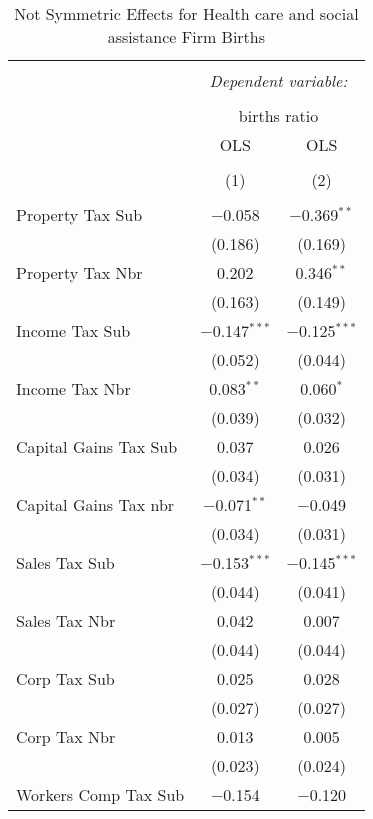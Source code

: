 
\begin{table}[!htbp] \centering 
  \caption{Not Symmetric Effects for  Health care and social assistance Firm Births} 
  \label{} 
\begin{tabular}{@{\extracolsep{5pt}}lcc} 
\\[-1.8ex]\hline 
\hline \\[-1.8ex] 
 & \multicolumn{2}{c}{\textit{Dependent variable:}} \\ 
\cline{2-3} 
\\[-1.8ex] & \multicolumn{2}{c}{births ratio} \\ 
 & OLS & OLS \\ 
\\[-1.8ex] & (1) & (2)\\ 
\hline \\[-1.8ex] 
 Property Tax Sub & $-$0.058 & $-$0.369$^{**}$ \\ 
  & (0.186) & (0.169) \\ 
  Property Tax Nbr & 0.202 & 0.346$^{**}$ \\ 
  & (0.163) & (0.149) \\ 
  Income Tax Sub & $-$0.147$^{***}$ & $-$0.125$^{***}$ \\ 
  & (0.052) & (0.044) \\ 
  Income Tax Nbr & 0.083$^{**}$ & 0.060$^{*}$ \\ 
  & (0.039) & (0.032) \\ 
  Capital Gains Tax Sub & 0.037 & 0.026 \\ 
  & (0.034) & (0.031) \\ 
  Capital Gains Tax nbr & $-$0.071$^{**}$ & $-$0.049 \\ 
  & (0.034) & (0.031) \\ 
  Sales Tax Sub & $-$0.153$^{***}$ & $-$0.145$^{***}$ \\ 
  & (0.044) & (0.041) \\ 
  Sales Tax Nbr & 0.042 & 0.007 \\ 
  & (0.044) & (0.044) \\ 
  Corp Tax Sub & 0.025 & 0.028 \\ 
  & (0.027) & (0.027) \\ 
  Corp Tax Nbr & 0.013 & 0.005 \\ 
  & (0.023) & (0.024) \\ 
  Workers Comp Tax Sub & $-$0.154 & $-$0.120 \\ 

\end{tabular}
\end{table}
